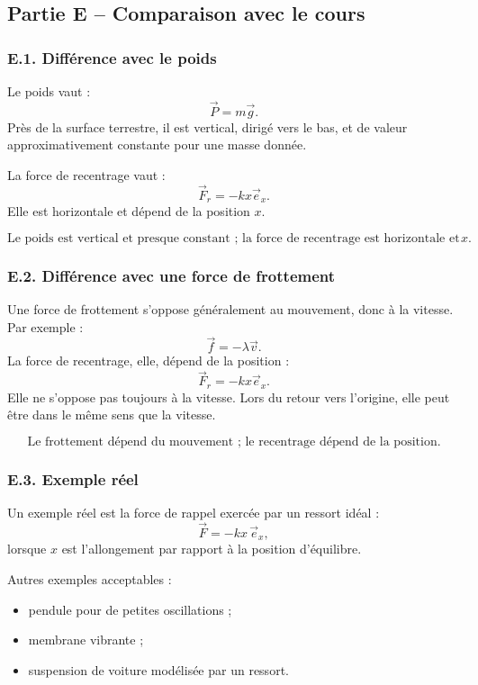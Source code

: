 \documentclass[11pt,a4paper]{article}
\begin{document}
\subsection{Partie E -- Comparaison avec le cours}

\subsubsection*{E.1. Différence avec le poids}

Le poids vaut :
\[
\vec P=m\vec g.
\]
Près de la surface terrestre, il est vertical, dirigé vers le bas, et de valeur approximativement constante pour une masse donnée.

La force de recentrage vaut :
\[
\vec F_r=-kx\vec e_x.
\]
Elle est horizontale et dépend de la position $x$.

\begin{resultatbox}
\[
\boxed{\text{Le poids est vertical et presque constant ; la force de recentrage est horizontale et dépend de }x.}
\]
\end{resultatbox}

\subsubsection*{E.2. Différence avec une force de frottement}

Une force de frottement s'oppose généralement au mouvement, donc à la vitesse.
Par exemple :
\[
\vec f=-\lambda \vec v.
\]
La force de recentrage, elle, dépend de la position :
\[
\vec F_r=-kx\vec e_x.
\]
Elle ne s'oppose pas toujours à la vitesse. Lors du retour vers l'origine, elle peut être dans le même sens que la vitesse.

\begin{resultatbox}
\[
\boxed{\text{Le frottement dépend du mouvement ; le recentrage dépend de la position.}}
\]
\end{resultatbox}

\subsubsection*{E.3. Exemple réel}

Un exemple réel est la force de rappel exercée par un ressort idéal :
\[
\vec F=-k x\,\vec e_x,
\]
lorsque $x$ est l'allongement par rapport à la position d'équilibre.

Autres exemples acceptables :
\begin{itemize}
  \item pendule pour de petites oscillations ;
  \item membrane vibrante ;
  \item suspension de voiture modélisée par un ressort.
\end{itemize}
\end{document}
